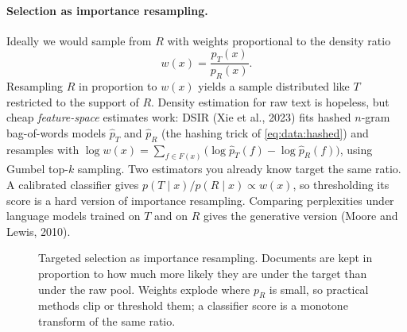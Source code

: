\paragraph{Selection as importance resampling.} Ideally we would sample from $R$ with weights
proportional to the density ratio
\begin{equation}
w(x) = \frac{p_T(x)}{p_R(x)}.
\label{eq:proj4:dsir}
\end{equation}
Resampling $R$ in proportion to $w(x)$ yields a sample distributed like $T$ restricted to the support
of $R$. Density estimation for raw text is hopeless, but cheap \emph{feature-space} estimates work: DSIR
(Xie et al., 2023) fits hashed $n$-gram bag-of-words models $\hat p_T$ and $\hat p_R$ (the hashing
trick of \cref{eq:data:hashed}) and resamples with
$\log w(x) = \sum_{f\in F(x)}\big(\log\hat p_T(f) - \log\hat p_R(f)\big)$, using Gumbel top-$k$
sampling. Two estimators you already know target the same ratio. A calibrated classifier gives
$p(T\mid x)/p(R\mid x)\propto w(x)$, so thresholding its score is a hard version of importance
resampling. Comparing perplexities under language models trained on $T$ and on $R$ gives the generative version
(Moore and Lewis, 2010).

\begin{figure}[t]
\centering
{}
\caption{Targeted selection as importance resampling. Documents are kept in proportion to how
much more likely they are under the target than under the raw pool. Weights explode where $p_R$
is small, so practical methods clip or threshold them; a classifier score is a monotone transform of
the same ratio.}
\label{fig:proj4:dsir}
\end{figure}

